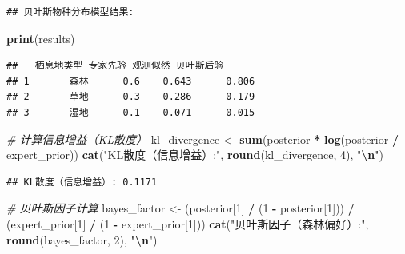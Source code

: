 \documentclass[
  twoside]{book}
\newenvironment{Shaded}{\begin{snugshade}}{\end{snugshade}}
\newcommand{\CommentTok}[1]{\textcolor[rgb]{0.56,0.35,0.01}{\textit{#1}}}
\newcommand{\DecValTok}[1]{\textcolor[rgb]{0.00,0.00,0.81}{#1}}
\newcommand{\FunctionTok}[1]{\textcolor[rgb]{0.13,0.29,0.53}{\textbf{#1}}}
\newcommand{\NormalTok}[1]{#1}
\newcommand{\OtherTok}[1]{\textcolor[rgb]{0.56,0.35,0.01}{#1}}
\newcommand{\SpecialCharTok}[1]{\textcolor[rgb]{0.81,0.36,0.00}{\textbf{#1}}}
\newcommand{\StringTok}[1]{\textcolor[rgb]{0.31,0.60,0.02}{#1}}
\begin{document}
\begin{verbatim}
## 贝叶斯物种分布模型结果:
\end{verbatim}

\begin{Shaded}
\begin{Highlighting}[]
\FunctionTok{print}\NormalTok{(results)}
\end{Highlighting}
\end{Shaded}

\begin{verbatim}
##   栖息地类型 专家先验 观测似然 贝叶斯后验
## 1       森林      0.6    0.643      0.806
## 2       草地      0.3    0.286      0.179
## 3       湿地      0.1    0.071      0.015
\end{verbatim}

\begin{Shaded}
\begin{Highlighting}[]
\CommentTok{\# 计算信息增益（KL散度）}
\NormalTok{kl\_divergence }\OtherTok{\textless{}{-}} \FunctionTok{sum}\NormalTok{(posterior }\SpecialCharTok{*} \FunctionTok{log}\NormalTok{(posterior }\SpecialCharTok{/}\NormalTok{ expert\_prior))}
\FunctionTok{cat}\NormalTok{(}\StringTok{"KL散度（信息增益）:"}\NormalTok{, }\FunctionTok{round}\NormalTok{(kl\_divergence, }\DecValTok{4}\NormalTok{), }\StringTok{"}\SpecialCharTok{\textbackslash{}n}\StringTok{"}\NormalTok{)}
\end{Highlighting}
\end{Shaded}

\begin{verbatim}
## KL散度（信息增益）: 0.1171
\end{verbatim}

\begin{Shaded}
\begin{Highlighting}[]
\CommentTok{\# 贝叶斯因子计算}
\NormalTok{bayes\_factor }\OtherTok{\textless{}{-}}\NormalTok{ (posterior[}\DecValTok{1}\NormalTok{] }\SpecialCharTok{/}\NormalTok{ (}\DecValTok{1} \SpecialCharTok{{-}}\NormalTok{ posterior[}\DecValTok{1}\NormalTok{])) }\SpecialCharTok{/}\NormalTok{ (expert\_prior[}\DecValTok{1}\NormalTok{] }\SpecialCharTok{/}\NormalTok{ (}\DecValTok{1} \SpecialCharTok{{-}}\NormalTok{ expert\_prior[}\DecValTok{1}\NormalTok{]))}
\FunctionTok{cat}\NormalTok{(}\StringTok{"贝叶斯因子（森林偏好）:"}\NormalTok{, }\FunctionTok{round}\NormalTok{(bayes\_factor, }\DecValTok{2}\NormalTok{), }\StringTok{"}\SpecialCharTok{\textbackslash{}n}\StringTok{"}\NormalTok{)}
\end{Highlighting}
\end{Shaded}
\end{document}
